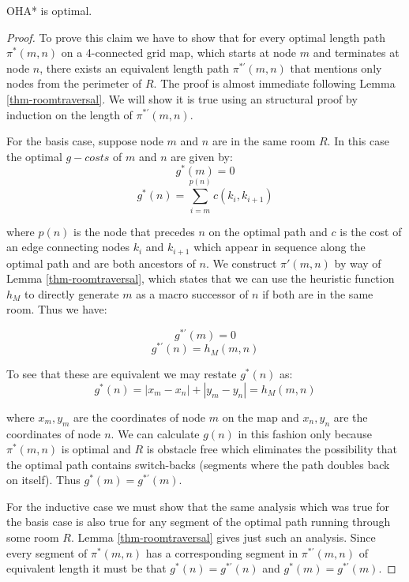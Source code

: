 \begin{mytheorem}
OHA* is optimal. 
\end{mytheorem}
\begin{proof}
To prove this claim we have to show that for every optimal length path $\pi^*(m, n)$ 
on a 4-connected grid map, which starts at node $m$ and terminates at node $n$, 
there exists an equivalent length path $\pi^{*'}(m, n)$ that mentions only nodes from the
perimeter of $R$.
The proof is almost immediate following Lemma \ref{thm-roomtraversal}. 
We will show it is true using an structural proof by induction on the length
of $\pi^{*'}(m, n)$.
\par
For the basis case, suppose node $m$ and $n$ are in the same room $R$.
In this case the optimal $g-costs$ of $m$ and $n$ are given by:
$$g^*(m) = 0$$
$$ g^*(n) =  \sum_{i = m}^{p(n)}c(k_{i}, k_{i+1})$$ 

where $p(n)$ is the node that precedes $n$ on the optimal path and $c$ is the cost of 
an edge connecting nodes $k_{i}$ and $k_{i+1}$ which appear in sequence along the optimal path 
and are both ancestors of $n$.
We construct $\pi'(m, n)$ by way of Lemma \ref{thm-roomtraversal}, 
which states that we can use the heuristic function $h_{M}$ to directly generate $m$ as a 
macro successor of $n$ if both are in the same room.
Thus we have:

$$ g^{*'}(m) = 0 $$
$$ g^{*'}(n) = h_{M}(m, n)$$

To see that these are equivalent we may restate $g^*(n)$ as:
$$g^*(n) = |x_{m} - x_{n}| + |y_{m} - y_{n}| = h_{M}(m, n)$$

where $x_{m}, y_{m}$ are the coordinates of node $m$ on the map and $x_{n}, y_{n}$ are
the coordinates of node $n$.
We can calculate $g(n)$ in this fashion only because $\pi^*(m,n)$ is optimal and $R$ is
obstacle free which eliminates the possibility that the optimal path contains
 switch-backs (segments where the path doubles back on itself).
Thus $g^{*}(m) = g^{*'}(m)$.
\par
For the inductive case we must show that the same analysis which was true for the basis case
is also true for any segment of the optimal path running through some room $R$. 
Lemma \ref{thm-roomtraversal} gives just such an analysis.
Since every segment of $\pi^{*}(m, n)$ has a corresponding segment in $\pi^{*'}(m, n)$ of equivalent
length it must be that $g^*(n) = g^{*'}(n)$ and $g^*(m) = g^{*'}(m)$.
\end{proof}

